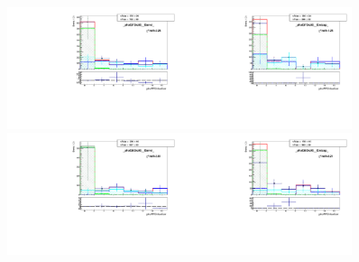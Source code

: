 \begin{figure}[htb]
  \begin{center}
   \includegraphics[width=0.45\textwidth]{../figs/figs_v11/MUON_WGamma/TemplateFits/c_TEMPL_CHISO_UNblind__phoEt75to85__Barrel__RooFit_MCclosure.pdf}\includegraphics[width=0.45\textwidth]{../figs/figs_v11/MUON_WGamma/TemplateFits/c_TEMPL_CHISO_UNblind__phoEt75to85__Endcap__RooFit_MCclosure.pdf}\\
   \includegraphics[width=0.45\textwidth]{../figs/figs_v11/MUON_WGamma/TemplateFits/c_TEMPL_CHISO_UNblind__phoEt85to95__Barrel__RooFit_MCclosure.pdf}\includegraphics[width=0.45\textwidth]{../figs/figs_v11/MUON_WGamma/TemplateFits/c_TEMPL_CHISO_UNblind__phoEt85to95__Endcap__RooFit_MCclosure.pdf}\\

\end{center}
\end{figure}

